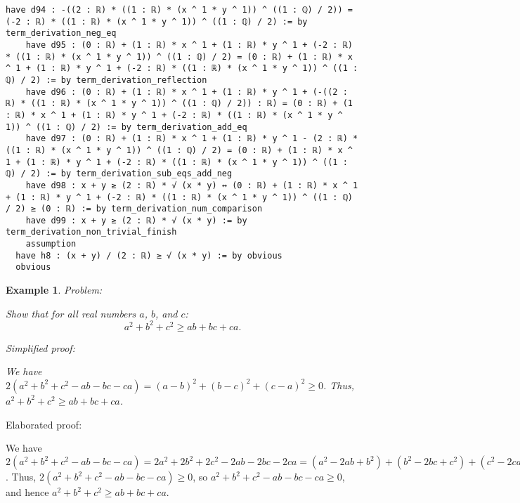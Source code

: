 \documentclass{article}
\newtheorem{example}{Example}
\begin{document}
\begin{tcolorbox}[colback=white!10, width=\linewidth]
\begin{lstlisting}[language=Lean4]
    have d94 : -((2 : ℝ) * ((1 : ℝ) * (x ^ 1 * y ^ 1)) ^ ((1 : ℚ) / 2)) = (-2 : ℝ) * ((1 : ℝ) * (x ^ 1 * y ^ 1)) ^ ((1 : ℚ) / 2) := by term_derivation_neg_eq
    have d95 : (0 : ℝ) + (1 : ℝ) * x ^ 1 + (1 : ℝ) * y ^ 1 + (-2 : ℝ) * ((1 : ℝ) * (x ^ 1 * y ^ 1)) ^ ((1 : ℚ) / 2) = (0 : ℝ) + (1 : ℝ) * x ^ 1 + (1 : ℝ) * y ^ 1 + (-2 : ℝ) * ((1 : ℝ) * (x ^ 1 * y ^ 1)) ^ ((1 : ℚ) / 2) := by term_derivation_reflection
    have d96 : (0 : ℝ) + (1 : ℝ) * x ^ 1 + (1 : ℝ) * y ^ 1 + (-((2 : ℝ) * ((1 : ℝ) * (x ^ 1 * y ^ 1)) ^ ((1 : ℚ) / 2)) : ℝ) = (0 : ℝ) + (1 : ℝ) * x ^ 1 + (1 : ℝ) * y ^ 1 + (-2 : ℝ) * ((1 : ℝ) * (x ^ 1 * y ^ 1)) ^ ((1 : ℚ) / 2) := by term_derivation_add_eq
    have d97 : (0 : ℝ) + (1 : ℝ) * x ^ 1 + (1 : ℝ) * y ^ 1 - (2 : ℝ) * ((1 : ℝ) * (x ^ 1 * y ^ 1)) ^ ((1 : ℚ) / 2) = (0 : ℝ) + (1 : ℝ) * x ^ 1 + (1 : ℝ) * y ^ 1 + (-2 : ℝ) * ((1 : ℝ) * (x ^ 1 * y ^ 1)) ^ ((1 : ℚ) / 2) := by term_derivation_sub_eqs_add_neg
    have d98 : x + y ≥ (2 : ℝ) * √ (x * y) ↔ (0 : ℝ) + (1 : ℝ) * x ^ 1 + (1 : ℝ) * y ^ 1 + (-2 : ℝ) * ((1 : ℝ) * (x ^ 1 * y ^ 1)) ^ ((1 : ℚ) / 2) ≥ (0 : ℝ) := by term_derivation_num_comparison
    have d99 : x + y ≥ (2 : ℝ) * √ (x * y) := by term_derivation_non_trivial_finish
    assumption
  have h8 : (x + y) / (2 : ℝ) ≥ √ (x * y) := by obvious
  obvious

\end{lstlisting}
\end{tcolorbox}


\begin{example}
Problem:
\begin{tcolorbox}[colback=yellow!10, width=\linewidth]
Show that for all real numbers $a$, $b$, and $c$:
    $$a^2 + b^2 + c^2 \geq ab + bc + ca.$$
\end{tcolorbox}

Simplified proof:
\begin{tcolorbox}[colback=blue!10, width=\linewidth]
We have $2(a^2 + b^2 + c^2 - ab - bc - ca) = (a-b)^2 + (b-c)^2 + (c-a)^2 \ge 0$. Thus, $a^2 + b^2 + c^2 \geq ab + bc + ca$.
\end{tcolorbox}
\end{example}

Elaborated proof:
\begin{tcolorbox}[colback=green!10, width=\linewidth]
We have $2(a^2 + b^2 + c^2 - ab - bc - ca) = 2a^2 + 2b^2 + 2c^2 - 2ab - 2bc - 2ca = (a^2 - 2ab + b^2) + (b^2 - 2bc + c^2) + (c^2 - 2ca + a^2) = (a-b)^2 + (b-c)^2 + (c-a)^2 \ge 0$. Thus, $2(a^2 + b^2 + c^2 - ab - bc - ca) \ge 0$, so $a^2 + b^2 + c^2 - ab - bc - ca \ge 0$, and hence $a^2 + b^2 + c^2 \geq ab + bc + ca$.
\end{tcolorbox}
\end{document}
